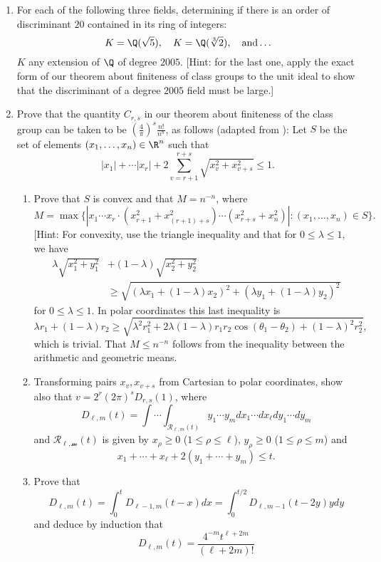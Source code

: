 \begin{enumerate}

\item For each of the following three fields, determining if there is
  an order of discriminant $20$ contained in its ring of integers:
$$
  K = \Q(\sqrt{5}), \quad K=\Q(\sqrt[3]{2}), \quad\text{and}\ldots
$$
$K$ any extension of $\Q$ of degree $2005$.  [Hint: for the last one,
apply the exact form of our theorem about finiteness of class groups
to the unit ideal to show that the discriminant of a degree $2005$
field must be large.]

\item Prove that the quantity $C_{r,s}$ in our theorem about finiteness
of the class group can be taken to be $\left(\frac{4}{\pi}\right)^{s} \frac{n!}{n^n}$, as follows (adapted from \cite[pg.~19]{sd:brief}):
Let $S$ be the set of elements
$(x_1,\ldots, x_{n})\in\R^n$ such that
$$
  |x_1| + \cdots |x_{r}| + 2 \sum_{v=r+1}^{r+s}
                    \sqrt{x_v^2 + x_{v+s}^2} \leq 1.
$$
\begin{enumerate}
\item 
Prove that $S$ is convex and that $M=n^{-n}$,
where 
$$
  M = \max\{ |x_1\cdots x_r\cdot (x_{r+1}^2 + x_{(r+1)+s}^2)\cdots (x_{r+s}^2 + x_n^2)| : (x_1,\ldots, x_n) \in S\}.
$$
[Hint: For convexity, use the triangle inequality and
that for $0\leq \lambda \leq 1$, we have
\begin{align*}
\lambda\sqrt{x_1^2 + y_1^2} &+ (1-\lambda)\sqrt{x_2^2+y_2^2}\\
&\geq\sqrt{(\lambda x_1 + (1-\lambda)x_2)^2 + 
(\lambda y_1 + (1-\lambda)y_2)^2}
\end{align*}
for $0\leq \lambda \leq 1$.  In polar coordinates this last inequality
is 
$$
  \lambda r_1 + (1-\lambda)r_2 \geq 
   \sqrt{\lambda^2 r_1^2 + 2\lambda(1-\lambda) r_1 r_2 \cos(\theta_1 - \theta_2) + (1-\lambda)^2 r_2^2},
$$
which is trivial.  That $M\leq n^{-n}$ follows from the inequality
between the arithmetic and geometric means.
\item Transforming pairs $x_v, x_{v+s}$ from Cartesian to polar coordinates,
show also that $v=2^{r}(2\pi)^s D_{r,s}(1)$, where
$$
  D_{\ell,m}(t) = \int \cdots \int_{\mathcal{R}_{\ell,m}(t)}
       y_1 \cdots y_m dx_1 \cdots dx_{\ell} dy_1 \cdots dy_m
$$
and 
$\mathcal{R_{\ell,m}}(t)$ is given by $x_{\rho}\geq 0$
($1\leq \rho\leq \ell$), $y_{\rho}\geq 0$
($1\leq \rho\leq m$) and 
$$
  x_1 + \cdots + x_{\ell} + 2(y_1+\cdots +y_m) \leq t.
$$
\item Prove that
$$
  D_{\ell,m}(t) = \int_{0}^t D_{\ell-1,m}(t-x)dx
     =\int_{0}^{t/2} D_{\ell,m-1}(t-2y)y dy
$$
and deduce by induction that 
$$
  D_{\ell,m}(t) = \frac{4^{-m}t^{\ell+2m}}{(\ell+2m)!}
$$
\end{enumerate}



\end{enumerate}
